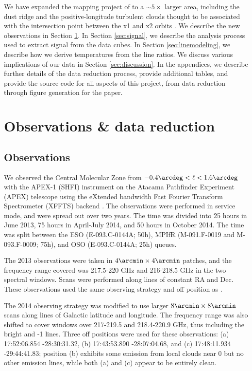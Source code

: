 We have expanded the \formaldehyde mapping project of \citet{Ao2013a} to a
$\sim5\times$ larger area, including the dust ridge and the positive-longitude
turbulent clouds thought to be associated with the intersection point between
the x1 and x2 orbits \citep{Rodriguez-Fernandez2006b,Riquelme2013a}.  We
describe the new
observations in Section \ref{sec:observations}.  In Section \ref{sec:signal},
we describe the analysis process used to extract signal from the data cubes.
In Section \ref{sec:linemodeling}, we describe how we 
derive temperatures from the line ratios.
We discuss various implications of our data in Section
\ref{sec:discussion}.  In the appendices, we describe further details of the
data reduction process, provide additional tables, and provide the source code
for all aspects of this project, from data reduction through figure generation
for the paper.


\section{Observations \& data reduction}
\label{sec:observations}

\subsection{Observations}
We observed the Central Molecular Zone from $-0.4\arcdeg < \ell < 1.6\arcdeg$
with the APEX-1 (SHFI) instrument \citep{Vassilev2008a} on the Atacama Pathfinder
Experiment (APEX) telescope \citep{Gusten2006b} using the eXtended bandwidth
Fast Fourier Transform
Spectrometer (XFFTS) backend \citep{Klein2012a}.  The observations were
performed in service mode, and were spread out over two years.  The time was
divided into 25 hours in June
2013, 75 hours in April-July 2014, and 50 hours in October 2014.  The time was
split between the ESO (E-093.C-0144A; 50h), MPIfR (M-091.F-0019 and
M-093.F-0009; 75h), and OSO (E-093.C-0144A; 25h) queues.

The 2013 observations were taken in $4\arcmin \times 4\arcmin$ patches, and the
frequency range covered was 217.5-220 GHz and 216-218.5 GHz in the two spectral
windows. Scans were performed along lines of constant RA and Dec.  These
observations used the same observing strategy and off position as
\citet{Ao2013a}.

The 2014 observing strategy was modified to use larger $8\arcmin \times
8\arcmin$ scans along lines of Galactic latitude and longitude.  The frequency
range was also shifted to cover windows over 217-219.5 and 218.4-220.9 GHz, thus
including the bright \thirteenco and -1 lines.
Three off positions were used for these observations: (a) 17:52:06.854
-28:30:31.32, (b) 17:43:53.890 -28:07:04.68, and (c) 17:48:11.934 -29:44:41.83;
position (b) exhibits some \thirteenco emission from local clouds near 0 \kms
but no other emission lines, while both (a) and (c) appear to be entirely
clean.

